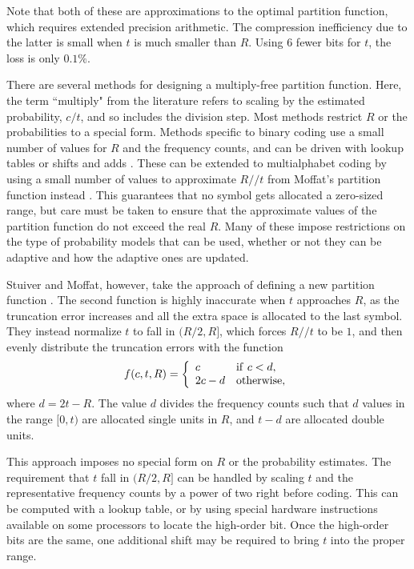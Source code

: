 \documentclass[11pt,letterpaper]{article}
\begin{document}
Note that both of these are approximations to the optimal partition function,
 which requires extended precision arithmetic.
The compression inefficiency due to the latter is small when $t$ is much
 smaller than $R$.
Using 6 fewer bits for $t$, the loss is only $0.1\%$.

There are several methods for designing a multiply-free partition function.
Here, the term ``multiply" from the literature refers to scaling by the
 estimated probability, $c/t$, and so includes the division step.
Most methods restrict $R$ or the probabilities to a special form.
Methods specific to binary coding use a small number of values for $R$ and
 the frequency counts, and can be driven with lookup tables or shifts and adds
 \cite{LR81, PMLA88, HV92, HV94, HM97}.
These can be extended to multialphabet coding by using a small number of values
 to approximate $R//t$ from Moffat's partition function instead
 \cite{RM89, CKW91, PS93, Lei95, FP97}.
This guarantees that no symbol gets allocated a zero-sized range, but care must
 be taken to ensure that the approximate values of the partition function do
 not exceed the real $R$.
Many of these impose restrictions on the type of probability models that can be
 used, whether or not they can be adaptive and how the adaptive ones are
 updated.

Stuiver and Moffat, however, take the approach of defining a new partition
 function \cite{SM98}.
The second function is highly inaccurate when $t$ approaches $R$, as the
 truncation error increases and all the extra space is allocated to the last
 symbol.
They instead normalize $t$ to fall in $(R/2,R]$, which forces $R//t$ to be $1$,
 and then evenly distribute the truncation errors with the function
\begin{displaymath}
 f(c,t,R)=\left\{
 \begin{array}{ll}c&{\rm if\ }c<d,\\2c-d&{\rm otherwise},\end{array}
 \right.
\end{displaymath}
 where $d=2t-R$.
The value $d$ divides the frequency counts such that $d$ values in the range
 $[0,t)$ are allocated single units in $R$, and $t-d$ are allocated double
 units.

This approach imposes no special form on $R$ or the probability estimates.
The requirement that $t$ fall in $(R/2,R]$ can be handled by scaling $t$ and
 the representative frequency counts by a power of two right before coding.
This can be computed with a lookup table, or by using special hardware
 instructions available on some processors to locate the high-order bit.
Once the high-order bits are the same, one additional shift may be required to
 bring $t$ into the proper range.
\end{document}
